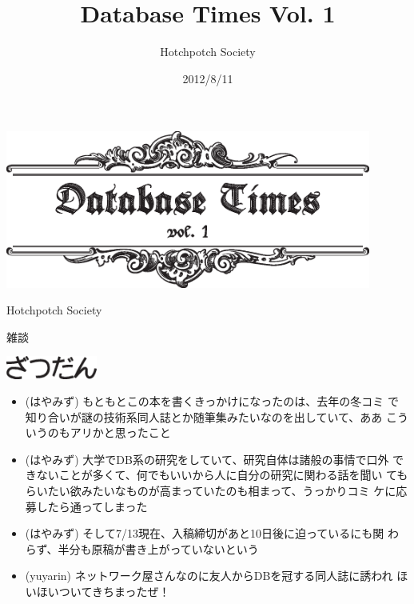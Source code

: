 \documentclass[b5paper,papersize,tombow,12pt]{jsbook}
\title{Database Times Vol. 1}
\date{2012/8/11}
\author{Hotchpotch Society}
\begin{document}
\thispagestyle{empty}

\frontmatter

\begin{center}
 \includegraphics[width=12cm]{hayamiz/images/title.eps}
 \par\vspace*{50mm}
 \noindent Hotchpotch Society
\end{center}



\setcounter{tocdepth}{0} %
\tableofcontents

\mainmatter

\pagestyle{fancy}









\cleardoublepage
\plainifnotempty
{}
{\protect\numberline 雑談}

\begin{center}
 \includegraphics[width=3cm]{images/zatsudan.eps}
\end{center}

%
%

\footnotesize

\begin{itemize}
 \item (はやみず) もともとこの本を書くきっかけになったのは、去年の冬コミ
       で知り合いが謎の技術系同人誌とか随筆集みたいなのを出していて、ああ
       こういうのもアリかと思ったこと
 \item (はやみず) 大学でDB系の研究をしていて、研究自体は諸般の事情で口外
       できないことが多くて、何でもいいから人に自分の研究に関わる話を聞い
       てもらいたい欲みたいなものが高まっていたのも相まって、うっかりコミ
       ケに応募したら通ってしまった
 \item (はやみず) そして7/13現在、入稿締切があと10日後に迫っているにも関
       わらず、半分も原稿が書き上がっていないという
 \item (yuyarin) ネットワーク屋さんなのに友人からDBを冠する同人誌に誘われ
       ほいほいついてきちまったぜ！
\end{itemize}
\end{document}
